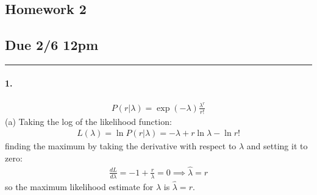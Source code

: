 \documentclass[../main.tex]{subfiles}
\begin{document}
\setcounter{section}{1}
\begin{center}
    \section*{Homework 2}
    \subsection*{Due 2/6 12pm}
\end{center}
\hrule \vspace{10px}

\paragraph*{1.}
\begin{align*}
    P(r | \lambda) = \exp(-\lambda) \frac{\lambda^r}{r!}
\end{align*}
(a) Taking the log of the likelihood function:
\begin{align*}
    L(\lambda) = \ln P(r | \lambda) = -\lambda + r \ln \lambda - \ln r!
\end{align*}
finding the maximum by taking the derivative with respect to $\lambda$ and setting it to zero:
\begin{align*}
    \frac{dL}{d\lambda} = -1 + \frac{r}{\lambda} = 0 \implies \hat \lambda = r
\end{align*}
so the maximum likelihood estimate for $\lambda$ is $\hat{\lambda} = r$.
\end{document}
